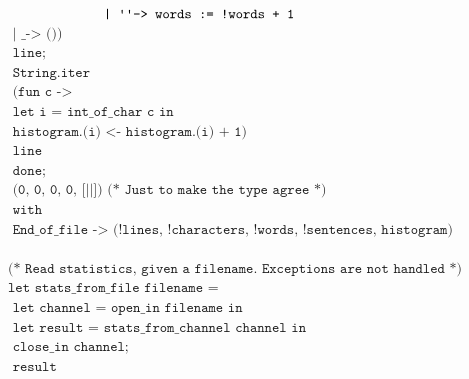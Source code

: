 \documentclass[]{book}
\newcommand\upquote[1]{\textquotesingle#1\textquotesingle}
\newcommand{\smspace}{\vspace{4mm}}
\begin{document}
\begin{center}
{\begin{minipage}{0.9\textwidth}
$\texttt{\ \ \ \ \ \ \ \ \ \ \ \ \ | \upquote{ } -> words := !words + 1}$\\
$\texttt{\ \ \ \ \ \ \ \ \ \ \ \ \ | \_ -> ())}$\\
$\texttt{\ \ \ \ \ \ \ \ \ \ \ \ line;}$\\
$\texttt{\ \ \ \ \ \ \ \ \ \ String.iter}$\\
$\texttt{\ \ \ \ \ \ \ \ \ \ \ \ (fun c ->}$\\
$\texttt{\ \ \ \ \ \ \ \ \ \ \ \ \ \ \ let i = int\_of\_char c in}$\\
$\texttt{\ \ \ \ \ \ \ \ \ \ \ \ \ \ \ \ \ histogram.(i) <- histogram.(i) + 1)}$\\
$\texttt{\ \ \ \ \ \ \ \ \ \ \ \ line}$\\
$\texttt{\ \ \ \ \ \ done;}$\\
$\texttt{\ \ \ \ \ \ (0, 0, 0, 0, [||]) (* Just to make the type agree *)}$\\
$\texttt{\ \ \ \ with}$\\
$\texttt{\ \ \ \ \ \ End\_of\_file -> (!lines, !characters, !words, !sentences, histogram)}$\\
\\
$\texttt{(* Read statistics, given a filename.\ Exceptions are not handled *)}$\\
$\texttt{let stats\_from\_file filename =}$\\
$\texttt{\ \ let channel = open\_in filename in}$\\
$\texttt{\ \ \ \ let result = stats\_from\_channel channel in}$\\
$\texttt{\ \ \ \ \ \ close\_in channel;}$\\
$\texttt{\ \ \ \ \ \ result}$\vphantom{g}
\end{minipage}}
\end{center}

\smspace
\end{document}
